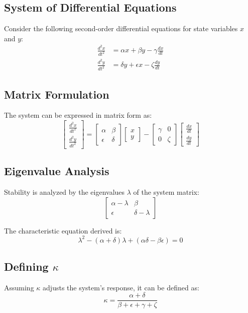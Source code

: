 \documentclass{article}
\begin{document}
\subsection{System of Differential Equations}
Consider the following second-order differential equations for state variables \( x \) and \( y \):
\begin{align}
\frac{d^2x}{dt^2} &= \alpha x + \beta y - \gamma \frac{dx}{dt} \\
\frac{d^2y}{dt^2} &= \delta y + \epsilon x - \zeta \frac{dy}{dt}
\end{align}

\subsection{Matrix Formulation}
The system can be expressed in matrix form as:
\[
\begin{bmatrix}
\frac{d^2x}{dt^2} \\
\frac{d^2y}{dt^2}
\end{bmatrix}
=
\begin{bmatrix}
\alpha & \beta \\
\epsilon & \delta
\end{bmatrix}
\begin{bmatrix}
x \\
y
\end{bmatrix}
-
\begin{bmatrix}
\gamma & 0 \\
0 & \zeta
\end{bmatrix}
\begin{bmatrix}
\frac{dx}{dt} \\
\frac{dy}{dt}
\end{bmatrix}
\]

\subsection{Eigenvalue Analysis}
Stability is analyzed by the eigenvalues \( \lambda \) of the system matrix:
\[
\begin{bmatrix}
\alpha - \lambda & \beta \\
\epsilon & \delta - \lambda
\end{bmatrix}
\]

The characteristic equation derived is:
\[
\lambda^2 - (\alpha + \delta)\lambda + (\alpha\delta - \beta\epsilon) = 0
\]

\subsection{Defining \( \kappa \)}
Assuming \( \kappa \) adjusts the system's response, it can be defined as:
\[
\kappa = \frac{\alpha + \delta}{\beta + \epsilon + \gamma + \zeta}
\]
\end{document}

